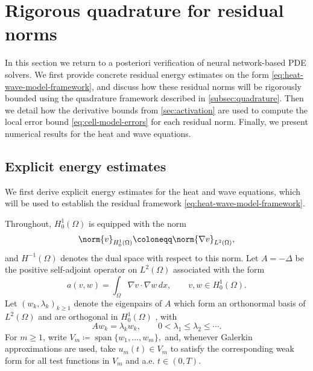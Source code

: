
\section{Rigorous quadrature for residual norms}\label{sec:applications}

In this section we return to a posteriori verification of neural network-based PDE solvers. We first provide concrete residual energy estimates on the form \eqref{eq:heat-wave-model-framework}, and discuss how these residual norms will be rigorously bounded using the quadrature framework described in \cref{subsec:quadrature}. Then we detail how the derivative bounds from \cref{sec:activation} are used to compute the local error bound \eqref{eq:cell-model-errors} for each residual norm.  Finally, we present numerical results for the heat and wave equations.



\subsection{Explicit energy estimates}\label{sec:energy-estimates}

We first derive explicit energy estimates for the heat and wave equations, which will be used to establish the residual framework \eqref{eq:heat-wave-model-framework}.

\begin{notation}\label{not:heat-wave-operator}
Throughout, \(H_0^1(\Omega)\) is equipped with the norm
\[
    \norm{v}_{H_0^1(\Omega)}\coloneqq\norm{\nabla v}_{L^2(\Omega)},
\]
and \(H^{-1}(\Omega)\) denotes the dual space with respect to this norm.
Let \(A=-\Delta\) be the positive self-adjoint operator on \(L^2(\Omega)\)
associated with the form
\[
    a(v,w)=\int_\Omega \nabla v\cdot\nabla w\,dx,
    \qquad v,w\in H_0^1(\Omega).
\]
Let \((w_k,\lambda_k)_{k\ge1}\) denote
the eigenpairs of \(A\) which form an orthonormal basis of
\(L^2(\Omega)\) and are orthogonal in \(H_0^1(\Omega)\)
\cite[Section 6.5, Theorem 1]{evans_2010}, with
\begin{equation}\label{eq:dirichlet-eigenbasis}
    Aw_k=\lambda_k w_k,
    \qquad
    0<\lambda_1\le\lambda_2\le\cdots .
\end{equation}
For \(m\ge1\), write
\(
    V_m\coloneqq \operatorname{span}\{w_1,\dots,w_m\},
\)
and, whenever Galerkin approximations are used, take \(u_m(t)\in V_m\) to
satisfy the corresponding weak form for all test functions in \(V_m\) and a.e.
\(t\in(0,T)\).

\end{notation}


